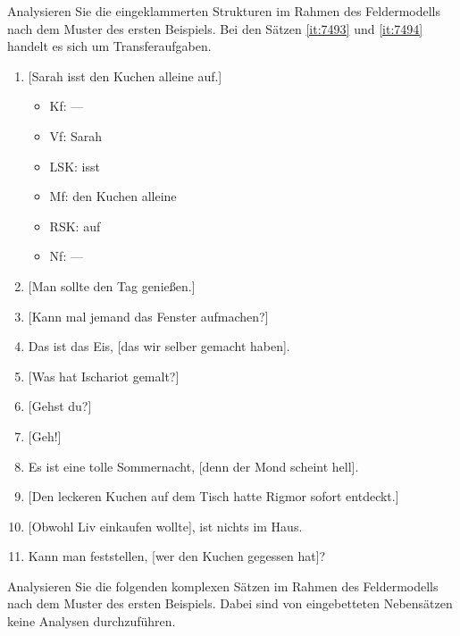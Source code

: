 \Uebungen

\Uebung \label{u121} Analysieren Sie die eingeklammerten Strukturen im Rahmen des Feldermodells nach dem Muster des ersten Beispiels.
Bei den Sätzen \ref{it:7493} und \ref{it:7494} handelt es sich um Transferaufgaben.

\begin{enumerate}\Lf
  \item{[Sarah isst den Kuchen alleine auf.]}
    \begin{itemize}\Lf
      \item Kf: ---
      \item Vf: Sarah
      \item LSK: isst
      \item Mf: den Kuchen alleine
      \item RSK: auf
      \item Nf: ---
    \end{itemize}
  \item{[Man sollte den Tag genießen.]}
  \item{[Kann mal jemand das Fenster aufmachen?]}
  \item\label{it:934254} Das ist das Eis, [das wir selber gemacht haben].
  \item{[Was hat Ischariot gemalt?]}
  \item{[Gehst du?]}
  \item{\label{it:7493} [Geh!]}
  \item\label{it:7494} Es ist eine tolle Sommernacht, [denn der Mond scheint hell].
  \item{[Den leckeren Kuchen auf dem Tisch hatte Rigmor sofort entdeckt.]}
  \item{[Obwohl Liv einkaufen wollte], ist nichts im Haus.}
  \item Kann man feststellen, [wer den Kuchen gegessen hat]?
\end{enumerate}

\Uebung \label{u122} Analysieren Sie die folgenden komplexen Sätzen im Rahmen des Feldermodells nach dem Muster des ersten Beispiels.
Dabei sind von eingebetteten Nebensätzen keine Analysen durchzuführen.

